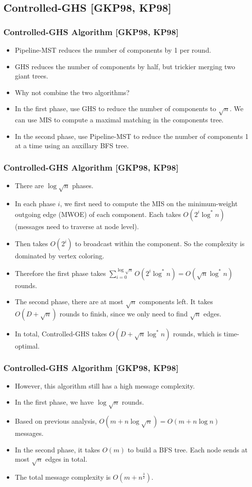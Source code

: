 \subsection{Controlled-GHS [GKP98, KP98]}
\begin{frame}
\frametitle{Controlled-GHS Algorithm [GKP98, KP98]}
\begin{itemize}
    \item Pipeline-MST reduces the number of components by 1 per round.
    \item GHS reduces the number of components by half, but trickier merging two giant trees.
    \item Why not combine the two algorithms?
    \item In the first phase, use GHS to reduce the number of components to $\sqrt{n}$. We can use MIS to compute a maximal matching in the components tree.
    \item In the second phase, use Pipeline-MST to reduce the number of components 1 at a time 
    using an auxillary BFS tree.
\end{itemize}
\end{frame}

\begin{frame}
\frametitle{Controlled-GHS Algorithm [GKP98, KP98]}
\begin{itemize}
\item There are $\log \sqrt{n}$ phases.
\item In each phase $i$, we first need to compute the MIS on the minimum-weight outgoing edge (MWOE) of each component. Each takes $O(2^i \log^*n)$ (messages need to traverse at node level). 
\item Then takes $O(2^i)$ to broadcast within the component. So the complexity is dominated by vertex coloring.
\item Therefore the first phase takes $\sum_{i=0}^{\log \sqrt{n}} O(2^i \log^* n) = O(\sqrt{n}\log^*n)$ rounds.
\item The second phase, there are at most $\sqrt{n}$ components left. It takes $O(D + \sqrt{n})$ rounds to finish, since we only need to find $\sqrt{n}$ edges.
\item In total, Controlled-GHS takes $O(D + \sqrt{n}\log^* n)$ rounds, which is time-optimal.
\end{itemize}
\end{frame}

\begin{frame}
\frametitle{Controlled-GHS Algorithm [GKP98, KP98]}
\begin{itemize}
\item However, this algorithm still has a high message complexity.
\item In the first phase, we have $\log \sqrt n$ rounds. 
\item Based on previous analysis, $O(m + n \log \sqrt{n}) = O(m + n\log n)$ messages.
\item In the second phase, it takes $O(m)$ to build a BFS tree. Each node sends at most $\sqrt{n}$ edges in total. 
\item The total message complexity is $O(m+n^{\frac{3}{2}}).$
\end{itemize}
\end{frame}